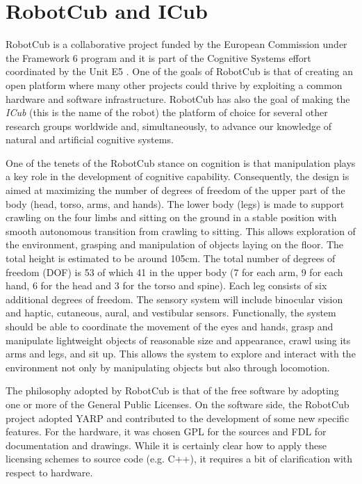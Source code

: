 
\section{RobotCub and ICub}
RobotCub is a collaborative project funded by the European Commission under 
the Framework 6 program and it is part of the Cognitive Systems effort 
coordinated by the Unit E5 \cite{e5-cognition}.
One of the goals of RobotCub is that of creating an open platform where
many other projects could thrive by exploiting a common hardware and software
infrastructure. RobotCub has also the goal of making the {\em ICub} (this is 
the name of the robot) the platform of choice for several other research
groups worldwide and, simultaneously, to advance our knowledge of natural and
artificial cognitive systems.

One of the tenets of the RobotCub stance on cognition is that manipulation 
plays a key role in the development of cognitive capability. Consequently, 
the design is aimed at maximizing the number of degrees of freedom of the upper 
part of the body (head, torso, arms, and hands). The lower body (legs) is made 
to support crawling on the four limbs and sitting on the ground in a stable 
position with smooth autonomous transition from crawling to sitting. This  
allows exploration of the environment, grasping and manipulation of objects 
laying on the floor. The total height is estimated to be around 105cm. The 
total number of degrees of freedom (DOF) is 53 of which 41 in the upper body 
(7 for each arm, 9 for each hand, 6 for the head and 3 for the torso and spine). 
Each leg consists of six additional degrees of freedom. The sensory system will 
include binocular vision and haptic, cutaneous, aural, and vestibular sensors. 
Functionally, the system should be able to coordinate the movement of the eyes 
and hands, grasp and manipulate lightweight objects of reasonable size and 
appearance, crawl using its arms and legs, and sit up. This allows the system 
to explore and interact with the environment not only by manipulating objects 
but also through locomotion.

The philosophy adopted by RobotCub is that of
the free software by adopting one or more of the General Public Licenses. 
On the software side, the RobotCub project adopted YARP and contributed
to the development of some new specific features. For the hardware, it 
was chosen GPL for the sources and FDL for documentation
and drawings. While it is certainly clear how to apply these licensing
schemes to source code (e.g. C++), it requires a bit of clarification 
with respect to hardware. 

